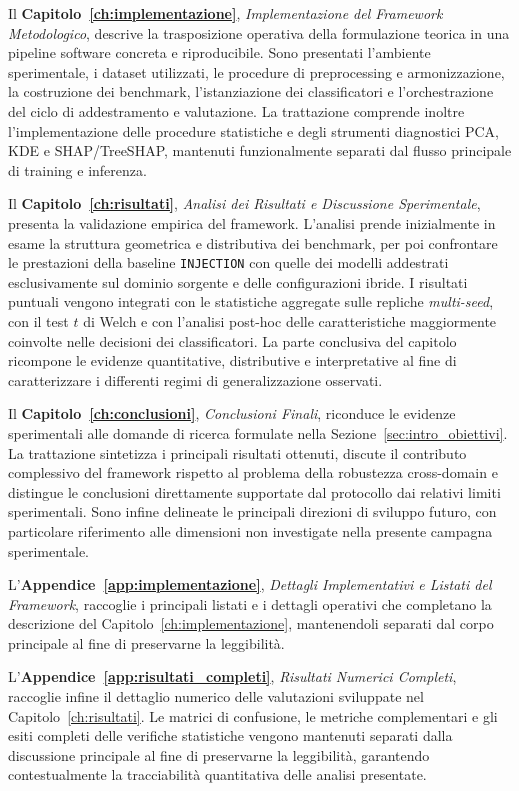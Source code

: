 Il \textbf{Capitolo~\ref{ch:implementazione}}, \textit{Implementazione del Framework Metodologico}, descrive la trasposizione operativa della formulazione teorica in una pipeline software concreta e riproducibile. 
Sono presentati l'ambiente sperimentale, i dataset utilizzati, le procedure di preprocessing e armonizzazione, la costruzione dei benchmark, l'istanziazione dei classificatori e l'orchestrazione del ciclo di addestramento e valutazione. 
La trattazione comprende inoltre l'implementazione delle procedure statistiche e degli strumenti diagnostici PCA, KDE e SHAP/TreeSHAP, mantenuti funzionalmente separati dal flusso principale di training e inferenza.

Il \textbf{Capitolo~\ref{ch:risultati}}, \textit{Analisi dei Risultati e Discussione Sperimentale}, presenta la validazione empirica del framework. 
L'analisi prende inizialmente in esame la struttura geometrica e distributiva dei benchmark, per poi confrontare le prestazioni della baseline \texttt{INJECTION} con quelle dei modelli addestrati esclusivamente sul dominio sorgente e delle configurazioni ibride. 
I risultati puntuali vengono integrati con le statistiche aggregate sulle repliche \textit{multi-seed}, con il test $t$ di Welch e con l'analisi post-hoc delle caratteristiche maggiormente coinvolte nelle decisioni dei classificatori. 
La parte conclusiva del capitolo ricompone le evidenze quantitative, distributive e interpretative al fine di caratterizzare i differenti regimi di generalizzazione osservati.

Il \textbf{Capitolo~\ref{ch:conclusioni}}, \textit{Conclusioni Finali}, riconduce le evidenze sperimentali alle domande di ricerca formulate nella Sezione~\ref{sec:intro_obiettivi}. 
La trattazione sintetizza i principali risultati ottenuti, discute il contributo complessivo del framework rispetto al problema della robustezza cross-domain e distingue le conclusioni direttamente supportate dal protocollo dai relativi limiti sperimentali. 
Sono infine delineate le principali direzioni di sviluppo futuro, con particolare riferimento alle dimensioni non investigate nella presente campagna sperimentale.

L'\textbf{Appendice~\ref{app:implementazione}}, \textit{Dettagli Implementativi e Listati del Framework}, raccoglie i principali listati e i dettagli operativi che completano la descrizione del Capitolo~\ref{ch:implementazione}, mantenendoli separati dal corpo principale al fine di preservarne la leggibilità.

L'\textbf{Appendice~\ref{app:risultati_completi}}, \textit{Risultati Numerici Completi}, raccoglie infine il dettaglio numerico delle valutazioni sviluppate nel Capitolo~\ref{ch:risultati}. 
Le matrici di confusione, le metriche complementari e gli esiti completi delle verifiche statistiche vengono mantenuti separati dalla discussione principale al fine di preservarne la leggibilità, garantendo contestualmente la tracciabilità quantitativa delle analisi presentate.
